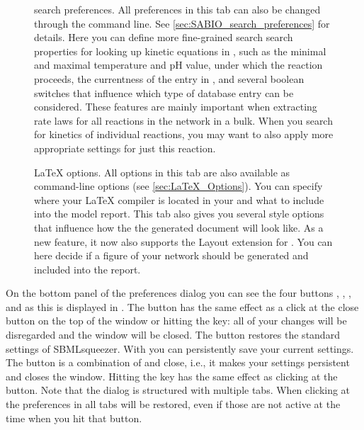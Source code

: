 \begin{figure}
\caption[\SABIO search preferences]{\SABIO search preferences.
All preferences in this tab can also be changed through the command line.
See \vref{sec:SABIO_search_preferences} for details.
Here you can define more fine-grained search search properties for looking up
kinetic equations in \SABIO, such as the minimal and maximal temperature and
pH value, under which the reaction proceeds, the currentness of the entry in
\SABIO, and several boolean switches that influence which type of database entry
can be considered.
These features are mainly important when extracting rate laws for all reactions
in the network in a bulk.
When you search for kinetics of individual reactions, you may want to also apply
more appropriate settings for just this reaction.}
\label{fig:SABIO-RK_search_preferences}
\end{figure}

\begin{figure}
\caption[\LaTeX{} options]{\LaTeX{} options.
All options in this tab are also available as command-line options
(see \vref{sec:LaTeX_Options}).
You can specify where your \LaTeX{} compiler is located in your \OS and what
to include into the model report.
This tab also gives you several style options that influence how the
the generated document will look like.
As a new feature, it now also supports the Layout extension for \SBML
\citep{Gauges2006}.
You can here decide if a figure of your network should be generated and
included into the report.}
\label{fig:LaTeX_Options}
\end{figure}
On the bottom panel of the preferences dialog you can see the four buttons
, , , and  as this is displayed in
.
The  button has the same effect as a click at the close button on the
top of the window or hitting the \keys{\escwin} key: all of your changes will be
disregarded and the window will be closed.
The  button restores the standard settings of SBMLsqueezer.
With  you can persistently save your current settings.
The  button is a combination of  and close, i.e., it makes your
settings persistent and closes the window.
Hitting the \keys{\return} key has the same effect as clicking at the  button.
Note that the dialog is structured with multiple tabs. When clicking at
 the preferences in all tabs will be restored, even if those are not
active at the time when you hit that button.


